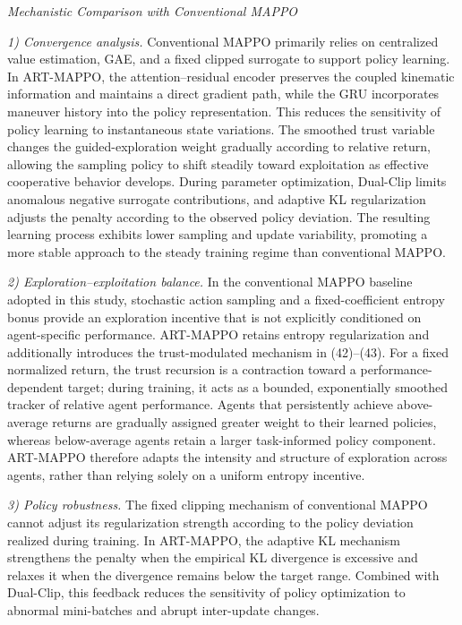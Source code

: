 \documentclass[11pt]{article}
\newcommand{\hladd}[1]{{\color{addblue}#1}}
\begin{document}
\begin{tcolorbox}[enhanced,breakable,colback=white,colframe=addblue!55,
boxrule=0.6pt,arc=2pt,left=9pt,right=9pt,top=7pt,bottom=7pt]
\hladd{\emph{Mechanistic Comparison with Conventional MAPPO}}

\medskip
\hladd{\emph{1) Convergence analysis.}
Conventional MAPPO primarily relies on centralized value estimation, GAE, and
a fixed clipped surrogate to support policy learning. In ART-MAPPO, the
attention--residual encoder preserves the coupled kinematic information and
maintains a direct gradient path, while the GRU incorporates maneuver history
into the policy representation. This reduces the sensitivity of policy learning
to instantaneous state variations. The smoothed trust variable changes the
guided-exploration weight gradually according to relative return, allowing the
sampling policy to shift steadily toward exploitation as effective cooperative
behavior develops. During parameter optimization, Dual-Clip limits anomalous
negative surrogate contributions, and adaptive KL regularization adjusts the
penalty according to the observed policy deviation. The resulting learning
process exhibits lower sampling and update variability, promoting a more stable
approach to the steady training regime than conventional MAPPO.}


\medskip
\hladd{\emph{2) Exploration--exploitation balance.}
In the conventional MAPPO baseline adopted in this study, stochastic action
sampling and a fixed-coefficient entropy bonus provide an exploration incentive
that is not explicitly conditioned on agent-specific performance. ART-MAPPO
retains entropy regularization and additionally introduces the trust-modulated
mechanism in (42)--(43). For a
fixed normalized return, the trust recursion is a contraction toward a
performance-dependent target; during training, it acts as a bounded,
exponentially smoothed tracker of relative agent performance. Agents that
persistently achieve above-average returns are gradually assigned greater
weight to their learned policies, whereas below-average agents retain a larger
task-informed policy component. ART-MAPPO therefore adapts the intensity and
structure of exploration across agents, rather than relying solely on a uniform
entropy incentive. }

\medskip
\hladd{\emph{3) Policy robustness.}
The fixed clipping mechanism of conventional MAPPO cannot adjust its
regularization strength according to the policy deviation realized during
training. In ART-MAPPO, the adaptive KL mechanism strengthens the penalty when
the empirical KL divergence is excessive and relaxes it when the divergence
remains below the target range. Combined with Dual-Clip, this feedback reduces
the sensitivity of policy optimization to abnormal mini-batches and abrupt
inter-update changes. }
\end{tcolorbox}
\end{document}
